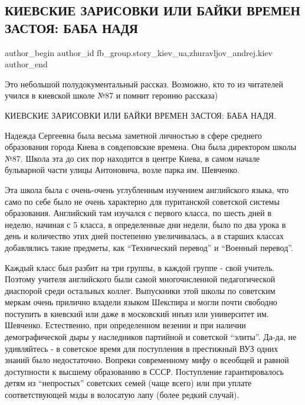  
 
 
 
 
 
\subsection{КИЕВСКИЕ ЗАРИСОВКИ ИЛИ БАЙКИ ВРЕМЕН ЗАСТОЯ: БАБА НАДЯ}
\label{sec:29_07_2020.fb.fb_group.story_kiev_ua.1.baba_nadja}
 
\ifcmt
 author_begin
   author_id fb_group.story_kiev_ua,zhuravljov_andrej.kiev
 author_end
\fi

Это небольшой полудокументальный рассказ. Возможно, кто то из читателей учился
в киевской школе №87 и помнит героиню рассказа)

КИЕВСКИЕ ЗАРИСОВКИ ИЛИ БАЙКИ ВРЕМЕН ЗАСТОЯ: БАБА НАДЯ.

Надежда Сергеевна была весьма заметной личностью в сфере среднего образования
города Киева в совдеповские времена. Она была директором школы №87. Школа эта
до сих пор находится в центре Киева, в самом начале бульварной части улицы
Антоновича, возле парка им. Шевченко. 

Эта школа была с очень-очень углубленным изучением английского языка, что само
по себе было не очень характерно для пуританской советской системы образования.
Английский там изучался с первого класса, по шесть дней в неделю, начиная с 5
класса, в определенные дни недели, было по два урока в день и количество этих
дней постепенно увеличивалась, а в старших классах добавлялись такие предметы,
как \enquote{Технический перевод} и \enquote{Военный перевод}. 

Каждый класс был разбит на три группы, в каждой группе -
свой учитель. Поэтому учителя английского были самой многочисленной
педагогической диаспорой среди остальных коллег. Выпускники этой школы по
советским меркам очень прилично владели языком Шекспира и могли почти свободно
поступить в киевский или даже в московский инъяз или университет им. Шевченко.
Естественно, при определенном везении и при наличии демографической дыры у
наследников партийной и советской \enquote{элиты}. Да-да, не удивляйтесь - в советское
время для поступления в престижный ВУЗ одних знаний было недостаточно. Вопреки
современному мифу о всеобщей и равной доступности к высшему образованию в СССР.
Поступление гарантировалось детям из \enquote{непростых} советских семей (чаще всего)
или при уплате соответствующей мзды в волосатую лапу (более редкий случай).


